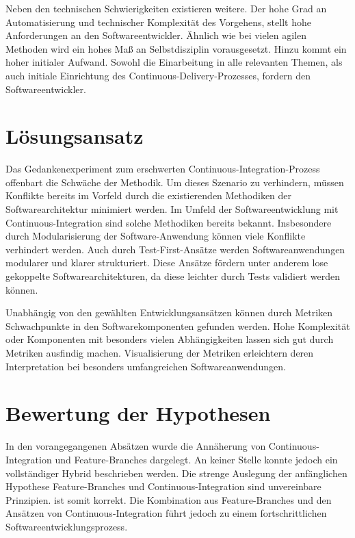 Neben den technischen Schwierigkeiten existieren weitere. Der hohe Grad an Automatisierung und technischer Komplexität des Vorgehens, stellt hohe Anforderungen an den Softwareentwickler. Ähnlich wie bei vielen agilen Methoden wird ein hohes Maß an Selbstdisziplin vorausgesetzt. Hinzu kommt ein hoher initialer Aufwand. Sowohl die Einarbeitung in alle relevanten Themen, als auch initiale Einrichtung des Continuous-Delivery-Prozesses, fordern den Softwareentwickler.

\section{Lösungsansatz}

Das Gedankenexperiment zum erschwerten Continuous-Integration-Prozess offenbart die Schwäche der Methodik. Um dieses Szenario zu verhindern, müssen Konflikte bereits im Vorfeld durch die existierenden Methodiken der Softwarearchitektur minimiert werden. Im Umfeld der Softwareentwicklung mit Continuous-Integration sind solche Methodiken bereits bekannt. Insbesondere durch Modularisierung der Software-Anwendung können viele Konflikte verhindert werden. Auch durch Test-First-Ansätze werden Softwareanwendungen modularer und klarer strukturiert. Diese Ansätze fördern unter anderem \glqq lose gekoppelte\grqq{}  Softwarearchitekturen, da diese leichter durch Tests validiert werden können. 

Unabhängig von den gewählten Entwicklungsansätzen können durch Metriken\\ Schwachpunkte in den Softwarekomponenten gefunden werden. Hohe Komplexität oder Komponenten mit besonders vielen Abhängigkeiten lassen sich gut durch Metriken ausfindig machen. Visualisierung der Metriken erleichtern deren Interpretation bei besonders umfangreichen Softwareanwendungen. 

\section{Bewertung der Hypothesen}

In den vorangegangenen Absätzen wurde die Annäherung von Continuous-Integration und Feature-Branches dargelegt. An keiner Stelle konnte jedoch ein vollständiger Hybrid beschrieben werden. Die strenge Auslegung der anfänglichen Hypothese \glqq Feature-Branches und Continuous-Integration sind unvereinbare Prinzipien.\grqq{} ist somit korrekt. Die Kombination aus Feature-Branches und den Ansätzen von Continuous-Integration führt jedoch zu einem fortschrittlichen Softwareentwicklungsprozess.

